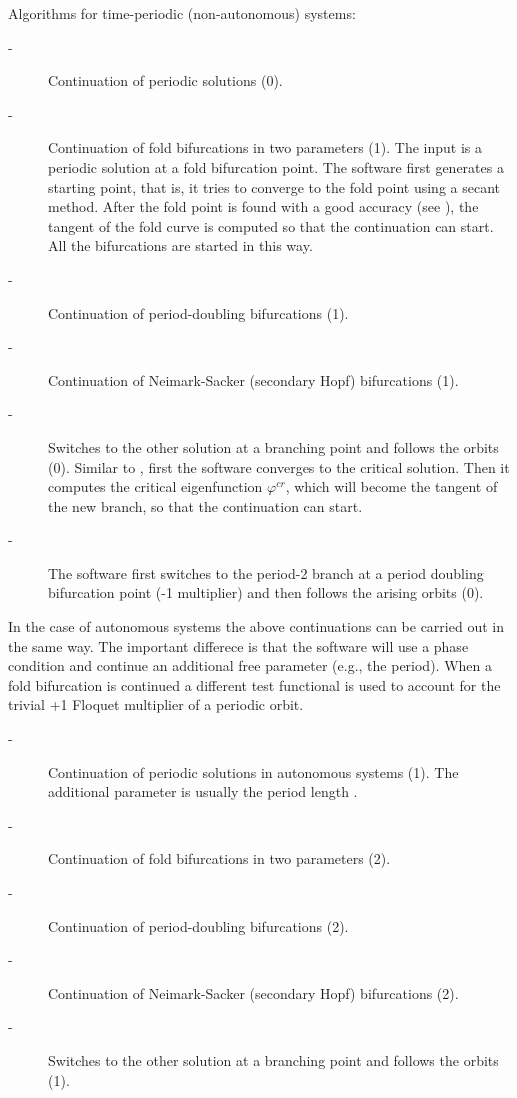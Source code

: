 \documentclass[10pt,a4paper]{ddedoc}
\begin{document}
\begin{description}
Algorithms for time-periodic (non-autonomous) systems:
\begin{description}
\item[ -] Continuation of periodic solutions (0).
%
\item[ -] Continuation of fold bifurcations in two parameters (1). The input is a periodic solution at a fold bifurcation point. The software first generates a starting point, that is, it tries to converge to the fold point using a secant method. After the fold point is found with a good accuracy (see ), the tangent of the fold curve is computed so that the continuation can start. All the bifurcations are started in this way.
%
\item[ -] Continuation of period-doubling bifurcations (1).
%
\item[ -] Continuation of Neimark-Sacker (secondary Hopf) bifurcations (1).
%
\item[ -] Switches to the other solution at a branching point and follows the orbits (0). Similar to , first the software converges to the critical solution. Then it computes the critical eigenfunction $\varphi^{cr}$, which will become the tangent of the new branch, so that the continuation can start.
%
\item[ -] The software first switches to the period-2 branch at a period doubling bifurcation point
(-1 multiplier) and then follows the arising orbits (0).
\end{description}
In the case of autonomous systems the above continuations can be carried out in the same way. The important differece is that the software will use a phase condition and continue an additional free parameter (e.g., the period). When a fold bifurcation is continued a different test functional is used to account for the trivial +1 Floquet multiplier of a periodic orbit.
\begin{description}
\item[ -] Continuation of periodic solutions in autonomous systems (1). The additional parameter is usually the period length .
%
\item[ -] Continuation of fold bifurcations in two parameters (2).
%
\item[ -] Continuation of period-doubling bifurcations (2).
%
\item[ -] Continuation of Neimark-Sacker (secondary Hopf) bifurcations (2).
%
\item[ -] Switches to the other solution at a branching point and follows the orbits (1).

\end{description}
\end{description}
\end{document}
